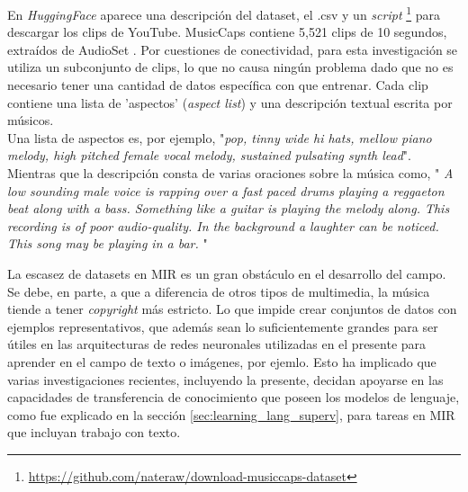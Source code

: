 En \textit{HuggingFace} \cite{huggFaceMusicCaps} aparece una descripción del dataset, el .csv y  un \textit{script} \footnote{\href{https://github.com/nateraw/download-musiccaps-dataset}{https://github.com/nateraw/download-musiccaps-dataset}}  para descargar los clips de YouTube. MusicCaps contiene 5,521 clips de 10 segundos, extraídos de AudioSet \cite{Gemmeke2017AudioSA}. Por cuestiones de conectividad, para esta investigación se utiliza un subconjunto de clips, lo que no causa ningún problema dado que no es necesario tener una cantidad de datos específica con que entrenar. Cada clip contiene una lista de 'aspectos' (\textit{aspect list}) y una descripción textual escrita por músicos. \\
Una lista de aspectos es, por ejemplo, "\textit{pop, tinny wide hi hats, mellow piano melody, high pitched female vocal melody, sustained pulsating synth lead}". \\
Mientras que la descripción consta de varias oraciones sobre la música como, " \textit{A low sounding male voice is rapping over a fast paced drums playing a reggaeton beat along with a bass. Something like a guitar is playing the melody along. This recording is of poor audio-quality. In the background a laughter can be noticed. This song may be playing in a bar.} "

La escasez de datasets en MIR es un gran obstáculo en el desarrollo del campo. Se debe, en parte, a que a diferencia de otros tipos de multimedia, la música tiende a tener \textit{copyright} más estricto. Lo que impide crear conjuntos de datos con ejemplos representativos, que además sean lo suficientemente grandes para ser útiles en las arquitecturas de redes neuronales utilizadas en el presente para aprender en el campo de texto o imágenes, por ejemlo. Esto ha implicado que varias investigaciones recientes, incluyendo la presente, decidan apoyarse en las capacidades de transferencia de conocimiento que poseen los modelos de lenguaje, como fue explicado en la sección \ref{sec:learning_lang_superv}, para tareas en MIR que incluyan trabajo con texto.
